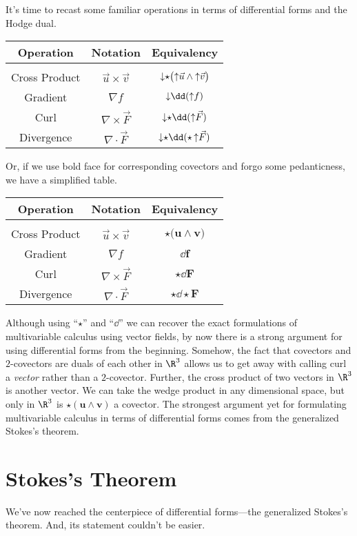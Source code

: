 It's time to recast some familiar operations in terms of differential forms and the Hodge dual.
\begin{center}
	\begin{tabular}{c|c|c}
	Operation & Notation & Equivalency\\
	\hline
	&&\\[-11pt]
	Cross Product & $\vec u\times \vec v$ & $\operatorname{\downarrow\!} \star \big(\!\operatorname{\uparrow\!}\vec u\wedge \operatorname{\uparrow\!}\vec v \big)$\rule{0pt}{10pt}\\[3pt]
	Gradient & $\nabla f$ & $\Trans \dd (\Transu f)$ \\[3pt]
	Curl & $\nabla \times \vec F$ & $\Trans \star \dd (\Transu \vec F)$\\[3pt]
	Divergence & $\nabla \cdot \vec F$ & $\Trans \star \dd (\star \Transu \vec F)$
	\end{tabular}
\end{center}
Or, if we use bold face for corresponding covectors and forgo some pedanticness,
we have a simplified table.
\begin{center}
	\begin{tabular}{c|c|c}
	Operation & Notation & Equivalency\\
	\hline
	&&\\[-11pt]
	Cross Product & $\vec u\times \vec v$ & $\star \big(\bm u\wedge \bm v \big)$\rule{0pt}{10pt}\\[3pt]
	Gradient & $\nabla f$ & $ \dd \bm f$\\[3pt]
	Curl & $\nabla \times \vec F$ & $\star \dd \bm F$\\[3pt]
	Divergence & $\nabla \cdot \vec F$ & $\star \dd \star \bm F$
	\end{tabular}
\end{center}

Although using ``$\star$'' and ``$\dd$'' we can recover the exact formulations of multivariable
calculus using vector fields, by now there is a strong argument for using differential
forms from the beginning.  Somehow, the fact that covectors and $2$-covectors are duals
of each other in $\R^3$ allows us to get away with calling curl a \emph{vector} rather
than a $2$-covector.  Further, the cross product of two vectors in $\R^3$ is another vector.
We can take the wedge product in any dimensional space, but only in $\R^3$ is $\star(\bm u\wedge \bm v)$
a covector.  The strongest argument yet for formulating multivariable calculus in terms of differential
forms comes from the generalized Stokes's theorem.

\section{Stokes's Theorem}
We've now reached the centerpiece of differential forms---the generalized Stokes's theorem.
And, its statement couldn't be easier.

